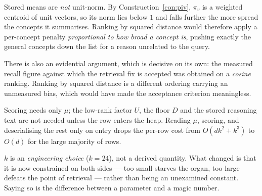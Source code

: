\begin{hon}\Hon
Stored means are \emph{not} unit-norm. By
Construction~\ref{con:piv}, $\pi_v$ is a weighted centroid of unit
vectors, so its norm lies below $1$ and falls further the more spread
the concepts it summarises. Ranking by squared distance would therefore
apply a per-concept penalty \emph{proportional to how broad a concept
is}, pushing exactly the general concepts down the list for a reason
unrelated to the query.

There is also an evidential argument, which is decisive on its own: the
measured recall figure against which the retrieval fix is accepted was
obtained on a \emph{cosine} ranking. Ranking by squared distance is a
different ordering carrying an unmeasured bias, which would have made
the acceptance criterion meaningless.
\end{hon}

\begin{remark}[Cost]
Scoring needs only $\mu$; the low-rank factor $U$, the floor $D$ and the
stored reasoning text are not needed unless the row enters the heap.
Reading $\mu$, scoring, and deserialising the rest only on entry drops
the per-row cost from $O(dk^2+k^3)$ to $O(d)$ for the large majority of
rows.
\end{remark}

\begin{hon}\Hon
$k$ is an \emph{engineering choice} ($k=24$), not a derived quantity.
What changed is that it is now constrained on both sides --- too small
starves the organ, too large defeats the point of retrieval --- rather
than being an unexamined constant. Saying so is the difference between a
parameter and a magic number.
\end{hon}
